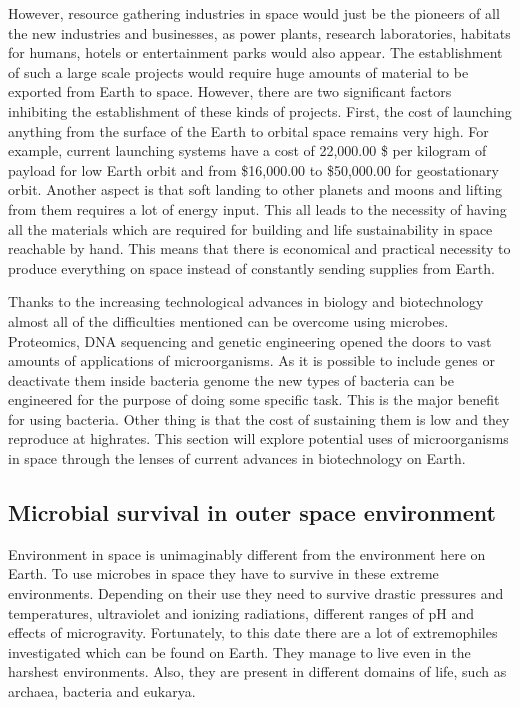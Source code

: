 \documentclass[12pt]{article}
\begin{document}
However, resource gathering industries in space would just be the pioneers of all the new industries and businesses, as power plants, research laboratories, habitats for humans, hotels or entertainment parks would also appear. The establishment of such a large scale projects would require huge amounts of material to be exported from Earth to space. However, there are two significant factors inhibiting the establishment of these kinds of projects. First, the cost of launching anything from the surface of the Earth to orbital space remains very high. For example, current launching systems have a cost of 22,000.00 \$ per kilogram of payload for low Earth orbit and from \$16,000.00 to \$50,000.00 for geostationary orbit. Another aspect is that soft landing to other planets and moons and lifting from them requires a lot of energy input. This all leads to the necessity of having all the materials which are required for building and life sustainability in space reachable by hand. This means that there is economical and practical necessity to produce everything on space instead of constantly sending supplies from Earth.


Thanks to the increasing technological advances in biology and biotechnology almost all of the difficulties mentioned can be overcome using microbes. Proteomics, DNA sequencing and genetic engineering opened the doors to vast amounts of applications of microorganisms. As it is possible to include genes or deactivate them inside bacteria genome the new types of bacteria
can be engineered for the purpose of doing some specific task. This is the major benefit for using bacteria. Other thing is that the cost of sustaining them is low and they reproduce at highrates. This section will explore potential uses of microorganisms in space through the lenses of current advances in biotechnology on Earth.

\subsection{Microbial survival in outer space environment}

Environment in space is unimaginably different from the environment here on Earth. To use microbes in space they have to survive in these extreme environments. Depending on their use they need to survive drastic pressures and temperatures, ultraviolet and ionizing radiations,
different ranges of pH and effects of microgravity. Fortunately, to this date there are a lot of extremophiles investigated which can be found on Earth. They manage to live even in the harshest environments. Also, they are present in different domains of life, such as archaea, bacteria and eukarya.
\end{document}
